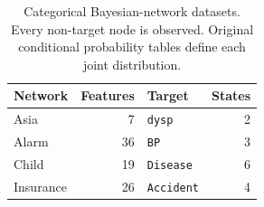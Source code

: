 \begin{table}[t]
\centering
{\small
\begin{tabular}{lrlr}
\toprule
Network & Features & Target & States \\
\midrule
Asia & 7 & \texttt{dysp} & 2 \\
Alarm & 36 & \texttt{BP} & 3 \\
Child & 19 & \texttt{Disease} & 6 \\
Insurance & 26 & \texttt{Accident} & 4 \\
\bottomrule
\end{tabular}
}
\caption{Categorical Bayesian-network datasets. Every non-target node is observed. Original conditional probability tables define each joint distribution.}
\label{tab:simulated-schema}
\end{table}
